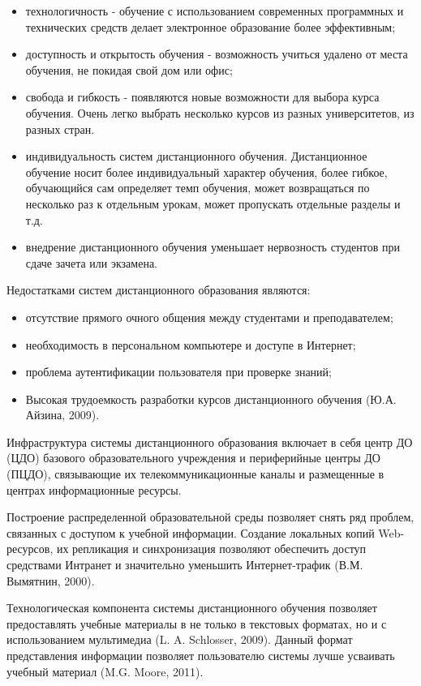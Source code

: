 \begin{itemize}
\item технологичность - обучение с использованием современных программных и технических средств делает электронное образование более эффективным; 
\item доступность и открытость обучения - возможность учиться удалено от места обучения, не покидая свой дом или офис; 
\item свобода и гибкость - появляются новые возможности для выбора курса обучения. Очень легко выбрать несколько курсов из разных университетов, из разных стран. 
\item индивидуальность систем дистанционного обучения. Дистанционное обучение носит более индивидуальный характер обучения, более гибкое, обучающийся сам определяет темп обучения, может возвращаться по несколько раз к отдельным урокам, может пропускать отдельные разделы и т.д. 
\item внедрение дистанционного обучения уменьшает нервозность студентов при сдаче зачета или экзамена. 
\end{itemize}

Недостатками систем дистанционного образования являются:

\begin{itemize}
\item отсутствие прямого очного общения между студентами и преподавателем;
\item необходимость в персональном компьютере и доступе в Интернет;
\item проблема аутентификации пользователя при проверке знаний;
\item Высокая трудоемкость разработки курсов дистанционного обучения (Ю.А. Айзина, 2009). 
\end{itemize}

Инфраструктура системы дистанционного образования включает в себя центр ДО (ЦДО) базового образовательного учреждения и периферийные центры ДО (ПЦДО), связывающие их телекоммуникационные каналы и размещенные в центрах информационные ресурсы.

Построение распределенной образовательной среды позволяет снять ряд проблем, связанных с доступом к учебной информации. Создание локальных копий Web-ресурсов, их репликация и синхронизация позволяют обеспечить доступ средствами Интранет и значительно уменьшить Интернет-трафик (В.М. Вымятнин, 2000).

Технологическая компонента системы дистанционного обучения позволяет предоставлять учебные материалы в не только в текстовых форматах, но и с использованием мультимедиа (L. A. Schlosser, 2009). Данный формат представления информации позволяет пользователю системы лучше усваивать учебный материал (M.G.  Moore, 2011).

